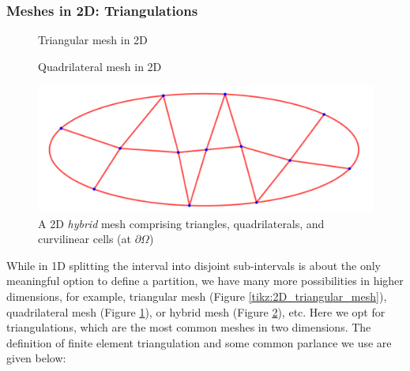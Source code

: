 	\subsubsection{Meshes in 2D: Triangulations}
	\begin{figure}[!htbp]
		\centering
		\begin{minipage}{.5\textwidth}
			\centering
			
			\caption{Triangular mesh in 2D}
			\label{tikz:2D_triangular_mesh}
		\end{minipage}%
		\begin{minipage}{.5\textwidth}
			\centering
			
			\caption{Quadrilateral mesh in 2D}
			\label{tikz:2D_quadrilateral_mesh}
		\end{minipage}
	\end{figure}

	\begin{figure}[!htbp]
		\centering
		\includegraphics[width=0.5\linewidth]{svg/2D_hybrid_mesh}
		\caption{A 2D \emph{hybrid} mesh comprising triangles,
		quadrilaterals, and curvilinear cells (at $\partial\Omega$)}
		\label{fig:2D_hybrid_mesh}
	\end{figure}	
	
	While in 1D splitting the interval into disjoint sub-intervals is about 
	the only meaningful option to define a partition, we have many more 
	possibilities in higher dimensions, for example, triangular mesh
	(Figure \ref{tikz:2D_triangular_mesh}), quadrilateral mesh
	(Figure \ref{tikz:2D_quadrilateral_mesh}), or hybrid mesh
	(Figure \ref{fig:2D_hybrid_mesh}), etc.
	Here we opt for triangulations, which are the most common meshes in two 
	dimensions. The definition of finite element triangulation and some 
	common parlance we use are given below:
	\label{def:triangulation}
%	
	
	
